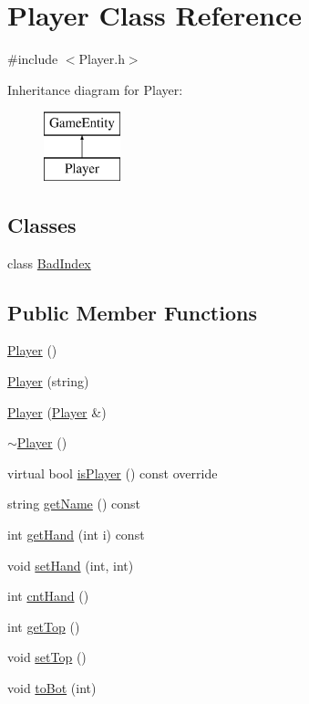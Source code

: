 \hypertarget{class_player}{}\section{Player Class Reference}
\label{class_player}


{\ttfamily \#include $<$Player.\+h$>$}

Inheritance diagram for Player\+:\begin{figure}[H]
\begin{center}
\leavevmode
\includegraphics[height=2.000000cm]{class_player}
\end{center}
\end{figure}
\subsection*{Classes}
\begin{DoxyCompactItemize}
\item 
class \mbox{\hyperlink{class_player_1_1_bad_index}{Bad\+Index}}
\end{DoxyCompactItemize}
\subsection*{Public Member Functions}
\begin{DoxyCompactItemize}
\item 
\mbox{\hyperlink{class_player_affe0cc3cb714f6deb4e62f0c0d3f1fd8}{Player}} ()
\item 
\mbox{\hyperlink{class_player_ab6de8696558d726f4f733c2e1f07b828}{Player}} (string)
\item 
\mbox{\hyperlink{class_player_ad2d305f9af724e761a491b7a85a020e0}{Player}} (\mbox{\hyperlink{class_player}{Player}} \&)
\item 
\mbox{\hyperlink{class_player_a749d2c00e1fe0f5c2746f7505a58c062}{$\sim$\+Player}} ()
\item 
virtual bool \mbox{\hyperlink{class_player_a95535954a888f7e37896d26d12ae2975}{is\+Player}} () const override
\item 
string \mbox{\hyperlink{class_player_a4939193fc637f75bf7a11118334dae7e}{get\+Name}} () const
\item 
int \mbox{\hyperlink{class_player_a47a59334ee6ddc63016a453b98f3da65}{get\+Hand}} (int i) const
\item 
void \mbox{\hyperlink{class_player_a38bb763292ccae8492422a2f2c15be5f}{set\+Hand}} (int, int)
\item 
int \mbox{\hyperlink{class_player_a7267ccfd35abdbedfc85935e968f2857}{cnt\+Hand}} ()
\item 
int \mbox{\hyperlink{class_player_a30bb76d5226dbba96a318fc4e9fcf537}{get\+Top}} ()
\item 
void \mbox{\hyperlink{class_player_a08590552e6997c5ae39a7af8463b8763}{set\+Top}} ()
\item 
void \mbox{\hyperlink{class_player_aadaa98941bffa5f85269786929fddcd1}{to\+Bot}} (int)
\end{DoxyCompactItemize}
